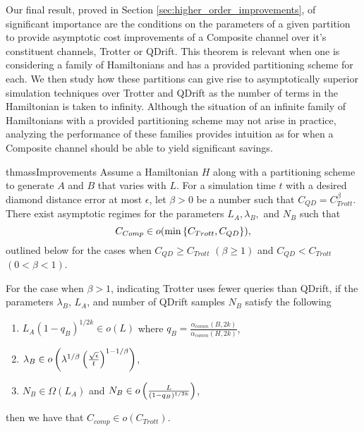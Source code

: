Our final result, proved in Section \ref{sec:higher_order_improvements}, of significant importance are the conditions on the parameters of a given partition to provide asymptotic cost improvements of a Composite channel over it's constituent channels, Trotter or QDrift. This theorem is relevant when one is considering a family of Hamiltonians and has a provided partitioning scheme for each. We then study how these partitions can give rise to asymptotically superior simulation techniques over Trotter and QDrift as the number of terms in the Hamiltonian is taken to infinity. Although the situation of an infinite family of Hamiltonians with a provided partitioning scheme may not arise in practice, analyzing the performance of these families provides intuition as for when a Composite channel should be able to yield significant savings.
\begin{restatable}{thm}{assImprovements} \label{thm:higher_order_improvements_general}
    Assume a Hamiltonian $H$ along with a partitioning scheme to generate $A$ and $B$ that varies with $L$. For a simulation time $t$ with a desired diamond 
    distance error at most $\epsilon$, let $\beta > 0$ be a number such that $C_{QD} = C_{Trott}^\beta$. There exist asymptotic regimes for the parameters $L_A, \lambda_B,$ and $N_B$ such that $$C_{Comp} \in o(\min \left\{ C_{Trott}, C_{QD} \right\}),$$ outlined below for the cases when $C_{QD} \geq C_{Trott}$  $(\beta \geq 1)$ and $C_{QD} < C_{Trott}$ $(0 < \beta < 1)$. 
    
    For the case when $\beta > 1$, indicating Trotter uses fewer queries than QDrift, if the parameters $\lambda_B$, $L_A$, and number of QDrift samples $N_B$ satisfy the following
    \begin{enumerate}
        \item $L_A (1 - q_B)^{1/2k} \in o(L)$ where $q_B = \frac{\alpha_{comm}(B, 2k)}{\alpha_{comm}(H, 2k)}$,
        \item $\lambda_B \in o \left( \lambda^{1/\beta} \left( \frac{\sqrt{\epsilon}}{t} \right)^{1-1/\beta} \right)$,
        \item $N_B \in \Omega(L_A)$ and $N_B \in o\left( \frac{L}{(1-q_B)^{1/2k}} \right)$,
    \end{enumerate}
    then we have that $C_{comp} \in o(C_{Trott})$.
    

\end{restatable}
